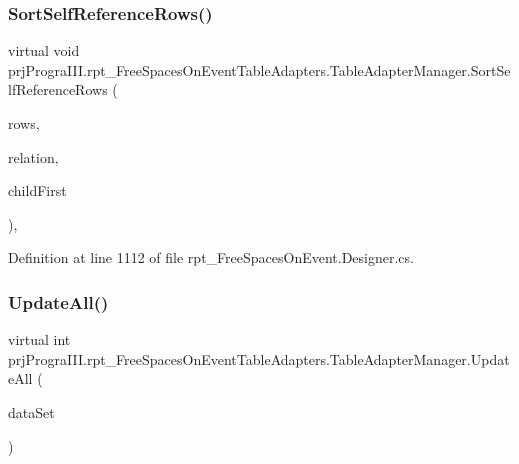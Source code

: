 \subsubsection{\texorpdfstring{Sort\+Self\+Reference\+Rows()}{SortSelfReferenceRows()}}
{\footnotesize\ttfamily virtual void prj\+Progra\+I\+I\+I.\+rpt\+\_\+\+Free\+Spaces\+On\+Event\+Table\+Adapters.\+Table\+Adapter\+Manager.\+Sort\+Self\+Reference\+Rows (\begin{DoxyParamCaption}\item[{global\+::\+System.\+Data.\+Data\+Row \mbox{[}$\,$\mbox{]}}]{rows,  }\item[{global\+::\+System.\+Data.\+Data\+Relation}]{relation,  }\item[{bool}]{child\+First }\end{DoxyParamCaption})\hspace{0.3cm}{\ttfamily [protected]}, {\ttfamily [virtual]}}



Definition at line 1112 of file rpt\+\_\+\+Free\+Spaces\+On\+Event.\+Designer.\+cs.

\hypertarget{classprj_progra_i_i_i_1_1rpt___free_spaces_on_event_table_adapters_1_1_table_adapter_manager_a684a94d71f9fb112715e3a291f5eeb5b}{}\label{classprj_progra_i_i_i_1_1rpt___free_spaces_on_event_table_adapters_1_1_table_adapter_manager_a684a94d71f9fb112715e3a291f5eeb5b} 
\subsubsection{\texorpdfstring{Update\+All()}{UpdateAll()}}
{\footnotesize\ttfamily virtual int prj\+Progra\+I\+I\+I.\+rpt\+\_\+\+Free\+Spaces\+On\+Event\+Table\+Adapters.\+Table\+Adapter\+Manager.\+Update\+All (\begin{DoxyParamCaption}\item[{\hyperlink{classprj_progra_i_i_i_1_1rpt___free_spaces_on_event}{rpt\+\_\+\+Free\+Spaces\+On\+Event}}]{data\+Set }\end{DoxyParamCaption})\hspace{0.3cm}{\ttfamily [virtual]}}




